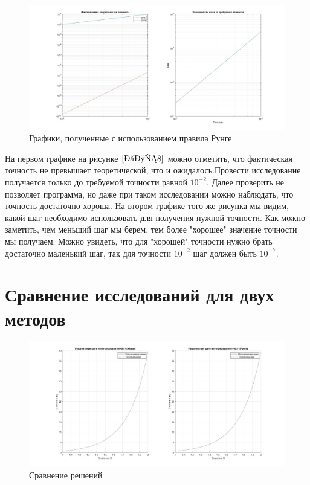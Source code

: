 \documentclass[a4paper]{article}
\begin{document}
\begin{figure}[h!]
\begin{center}
\includegraphics[scale=0.3]{правило рунге.jpg} 
\end{center}
\caption{Графики, полученные с использованием правила Рунге} \label{Рис8}
\end{figure}
На первом графике на рисунке $\ref{Рис8}$ можно отметить, что фактическая точность не превышает теоретической, что и ожидалось.Провести исследование получается только до требуемой точности равной $10^{-2}$. Далее проверить не позволяет программа, но даже при таком исследовании можно наблюдать, что точность достаточно хороша.  На втором графике того же рисунка мы видим, какой шаг необходимо использовать для получения нужной точности. Как можно заметить, чем меньший шаг мы берем, тем более "хорошее" значение точности мы получаем. Можно увидеть, что для "хорошей" точности нужно брать достаточно маленький шаг, так для точности $10^{-2}$ шаг должен быть $10^{-7}$.\\


\newpage
\section{Сравнение исследований для двух методов}

\begin{figure}[h!]
\begin{center}
\includegraphics[scale=0.3]{сравнение решение.jpg} 
\end{center}
\caption{Сравнение решений} \label{Рис9}
\end{figure}
\end{document}

